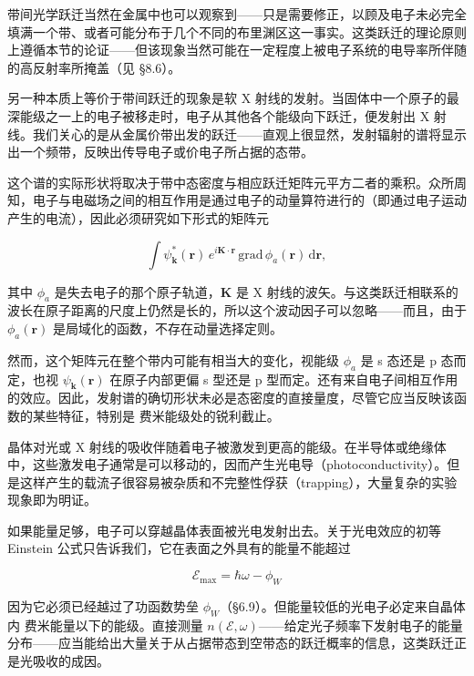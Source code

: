 带间光学跃迁当然在金属中也可以观察到——只是需要修正，以顾及电子未必完全填满一个带、或者可能分布于几个不同的布里渊区这一事实。这类跃迁的理论原则上遵循本节的论证——但该现象当然可能在一定程度上被电子系统的电导率所伴随的高反射率所掩盖（见 §8.6）。

另一种本质上等价于带间跃迁的现象是软 X 射线的发射。当固体中一个原子的最深能级之一上的电子被移走时，电子从其他各个能级向下跃迁，便发射出 X 射线。我们关心的是从金属价带出发的跃迁——直观上很显然，发射辐射的谱将显示出一个频带，反映出传导电子或价电子所占据的态带。


这个谱的实际形状将取决于带中态密度与相应跃迁矩阵元平方二者的乘积。众所周知，电子与电磁场之间的相互作用是通过电子的动量算符进行的（即通过电子运动产生的电流），因此必须研究如下形式的矩阵元

\begin{equation*}
\int \psi_{\mathbf{k}}^{*}(\mathbf{r})\, e^{i\mathbf{K}\cdot\mathbf{r}}\, \mathrm{grad}\,\phi_a(\mathbf{r})\,\mathrm{d}\mathbf{r},
\tag{8.76}
\end{equation*}

其中 $\phi_a$ 是失去电子的那个原子轨道，$\mathbf{K}$ 是 X 射线的波矢。与这类跃迁相联系的波长在原子距离的尺度上仍然是长的，所以这个波动因子可以忽略——而且，由于 $\phi_a(\mathbf{r})$ 是局域化的函数，不存在动量选择定则。

然而，这个矩阵元在整个带内可能有相当大的变化，视能级 $\phi_a$ 是 s 态还是 p 态而定，也视 $\psi_{\mathbf{k}}(\mathbf{r})$ 在原子内部更偏 s 型还是 p 型而定。还有来自电子间相互作用的效应。因此，发射谱的确切形状未必是态密度的直接量度，尽管它应当反映该函数的某些特征，特别是 费米能级处的锐利截止。

晶体对光或 X 射线的吸收伴随着电子被激发到更高的能级。在半导体或绝缘体中，这些激发电子通常是可以移动的，因而产生光电导（photoconductivity）。但是这样产生的载流子很容易被杂质和不完整性俘获（trapping），大量复杂的实验现象即为明证。

如果能量足够，电子可以穿越晶体表面被光电发射出去。关于光电效应的初等 Einstein 公式只告诉我们，它在表面之外具有的能量不能超过

\begin{equation*}
\mathcal{E}_{\max} = \hbar\omega - \phi_W
\tag{8.77}
\end{equation*}

因为它必须已经越过了功函数势垒 $\phi_W$（§6.9）。但能量较低的光电子必定来自晶体内 费米能量以下的能级。直接测量 $n(\mathcal{E},\omega)$——给定光子频率下发射电子的能量分布——应当能给出大量关于从占据带态到空带态的跃迁概率的信息，这类跃迁正是光吸收的成因。

